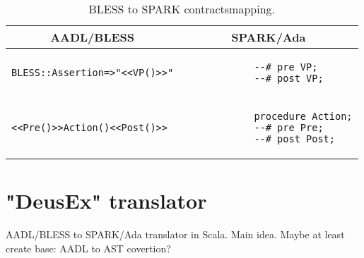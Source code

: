 \begin{table}[!ht]
	\caption{BLESS to SPARK contractsmapping.}
	\centering
  	\begin{tabular}{ | p{3in} | p{3in} |}

		\hline
		\multicolumn{1}{|c|}{\textbf{AADL/BLESS}} & \multicolumn{1}{|c|}{\textbf{SPARK/Ada}} \\ \hline

		\begin{lstlisting}[language=bless]
			BLESS::Assertion=>"<<VP()>>"
		\end{lstlisting} 
		& 
		\begin{lstlisting}
			--# pre VP;
			--# post VP; 
		\end{lstlisting} 

		\\ \hline

		\begin{lstlisting}[language=bless]
			<<Pre()>>Action()<<Post()>>
		\end{lstlisting} 
		& 
		\begin{lstlisting}
			procedure Action;
			--# pre Pre;
			--# post Post;
		\end{lstlisting} 

		\\ \hline
	\end{tabular}
\end{table}

\section{"DeusEx" translator}
\label{codegen:translator}
AADL/BLESS to SPARK/Ada translator in Scala. Main idea.
Maybe at least create base: AADL to AST covertion?

